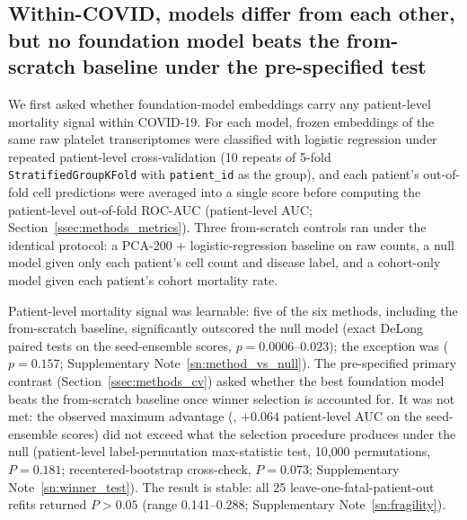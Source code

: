 \subsection{Within-COVID, models differ from each other, but no foundation model beats the from-scratch baseline under the pre-specified test}
\label{ssec:r1_within_covid}

We first asked whether foundation-model embeddings carry any patient-level
mortality signal within COVID-19. For each model, frozen embeddings of the same
raw platelet transcriptomes were classified with logistic regression under
repeated patient-level cross-validation (10 repeats of 5-fold
\texttt{StratifiedGroupKFold} with \texttt{patient\_id} as the group), and each
patient's out-of-fold cell predictions were averaged into a single score before
computing the patient-level out-of-fold ROC-AUC (patient-level AUC;
Section~\ref{ssec:methods_metrics}). Three from-scratch controls ran under the
identical protocol: a PCA-200 + logistic-regression baseline on raw counts, a
null model given only each patient's cell count and disease label, and a
cohort-only model given each patient's cohort mortality rate.

Patient-level mortality signal was learnable: five of the six methods,
including the from-scratch baseline, significantly outscored the null model
(exact DeLong paired tests on the seed-ensemble scores, $p = 0.0006$--$0.023$);
the exception was  ($p = 0.157$; Supplementary
Note~\ref{sn:method_vs_null}). The pre-specified primary contrast
(Section~\ref{ssec:methods_cv}) asked whether the best foundation model beats
the from-scratch baseline once winner selection is accounted for. It was not
met: the observed maximum advantage (, $+0.064$
patient-level AUC on the seed-ensemble scores) did not exceed what the
selection procedure produces under the null (patient-level label-permutation
max-statistic test, 10{,}000 permutations, $P = 0.181$; recentered-bootstrap
cross-check, $P = 0.073$; Supplementary Note~\ref{sn:winner_test}). The result
is stable: all 25 leave-one-fatal-patient-out refits returned $P > 0.05$
(range 0.141--0.288; Supplementary Note~\ref{sn:fragility}).

